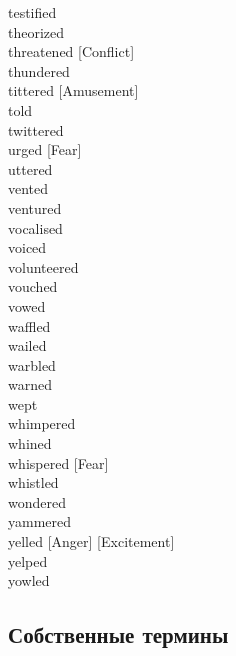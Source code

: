 testified \hfill \\
theorized \hfill \\
threatened [Conflict] \hfill \\
thundered \hfill \\
tittered [Amusement] \hfill \\
told \hfill \\
twittered \hfill \\
urged [Fear] \hfill \\
uttered \hfill \\
vented \hfill \\
ventured \hfill \\
vocalised \hfill \\
voiced \hfill \\
volunteered \hfill \\
vouched \hfill \\
vowed \hfill \\
waffled \hfill \\
wailed \hfill \\
warbled \hfill \\
warned \hfill \\
wept \hfill \\
whimpered \hfill \\
whined \hfill \\
whispered [Fear] \hfill \\
whistled \hfill \\
wondered \hfill \\
yammered \hfill \\
yelled [Anger] [Excitement] \hfill \\
yelped \hfill \\
yowled \hfill \\

\subsection{Собственные термины}

